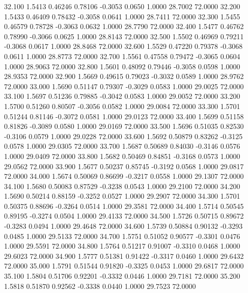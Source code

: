   32.100   1.5413   0.46246   0.78106  -0.3053   0.0650   1.0000  28.7002  72.0000
  32.200   1.5433   0.46409   0.78432  -0.3058   0.0641   1.0000  28.7411  72.0000
  32.300   1.5455   0.46579   0.78728  -0.3063   0.0632   1.0000  28.7790  72.0000
  32.400   1.5477   0.46762   0.78990  -0.3066   0.0625   1.0000  28.8143  72.0000
  32.500   1.5502   0.46969   0.79211  -0.3068   0.0617   1.0000  28.8468  72.0000
  32.600   1.5529   0.47220   0.79378  -0.3068   0.0611   1.0000  28.8773  72.0000
  32.700   1.5561   0.47558   0.79472  -0.3065   0.0604   1.0000  28.9063  72.0000
  32.800   1.5601   0.48092   0.79446  -0.3058   0.0598   1.0000  28.9353  72.0000
  32.900   1.5669   0.49615   0.79023  -0.3032   0.0589   1.0000  28.9762  72.0000
  33.000   1.5690   0.51147   0.79307  -0.3029   0.0583   1.0000  29.0025  72.0000
  33.100   1.5697   0.51236   0.79885  -0.3042   0.0583   1.0000  29.0052  72.0000
  33.200   1.5700   0.51260   0.80507  -0.3056   0.0582   1.0000  29.0084  72.0000
  33.300   1.5701   0.51244   0.81146  -0.3072   0.0581   1.0000  29.0123  72.0000
  33.400   1.5699   0.51158   0.81826  -0.3089   0.0580   1.0000  29.0169  72.0000
  33.500   1.5696   0.51035   0.82530  -0.3106   0.0579   1.0000  29.0228  72.0000
  33.600   1.5692   0.50879   0.83262  -0.3125   0.0578   1.0000  29.0305  72.0000
  33.700   1.5687   0.50689   0.84030  -0.3146   0.0576   1.0000  29.0409  72.0000
  33.800   1.5682   0.50469   0.84851  -0.3168   0.0573   1.0000  29.0562  72.0000
  33.900   1.5677   0.50237   0.85745  -0.3192   0.0568   1.0000  29.0817  72.0000
  34.000   1.5674   0.50069   0.86699  -0.3217   0.0558   1.0000  29.1307  72.0000
  34.100   1.5680   0.50083   0.87529  -0.3238   0.0543   1.0000  29.2100  72.0000
  34.200   1.5690   0.50214   0.88159  -0.3252   0.0527   1.0000  29.2907  72.0000
  34.300   1.5701   0.50375   0.88696  -0.3264   0.0514   1.0000  29.3581  72.0000
  34.400   1.5714   0.50545   0.89195  -0.3274   0.0504   1.0000  29.4133  72.0000
  34.500   1.5726   0.50715   0.89672  -0.3283   0.0494   1.0000  29.4648  72.0000
  34.600   1.5739   0.50884   0.90132  -0.3293   0.0485   1.0000  29.5133  72.0000
  34.700   1.5751   0.51052   0.90577  -0.3301   0.0476   1.0000  29.5591  72.0000
  34.800   1.5764   0.51217   0.91007  -0.3310   0.0468   1.0000  29.6023  72.0000
  34.900   1.5777   0.51381   0.91422  -0.3317   0.0460   1.0000  29.6432  72.0000
  35.000   1.5791   0.51544   0.91820  -0.3325   0.0453   1.0000  29.6817  72.0000
  35.100   1.5804   0.51706   0.92201  -0.3332   0.0446   1.0000  29.7181  72.0000
  35.200   1.5818   0.51870   0.92562  -0.3338   0.0440   1.0000  29.7523  72.0000
